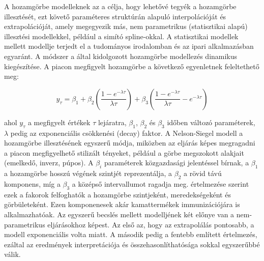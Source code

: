 \documentclass[12pt,bibliography=totoc]{article}
\begin{document}
A hozamgörbe modelleknek az a célja, hogy lehetővé tegyék a hozamgörbe illesztését, ezt követő paraméteres struktúrán alapuló interpolációját és extrapolációját, amely megegyezik más, nem parametrikus (statisztikai alapú) illesztési modellekkel, például a simító spline-okkal.
A statisztikai modellek mellett \cite{diebold2006forecasting} modellje terjedt el a tudományos irodalomban és az ipari alkalmazásban egyaránt. A módszer a \cite{nelson1987parsimonious} által kidolgozott hozamgörbe modellezés dinamikus kiegészítése. A piacon megfigyelt hozamgörbe a  következő egyenletnek feleltethető meg:

\begin{equation}
y_{\tau}=\beta_{1}+\beta_{2}\left ( \frac{1-e^{-\lambda\tau}}{\lambda\tau} \right )+\beta_{3}\left ( \frac{1-e^{-\lambda\tau}}{\lambda\tau} -e^{-\lambda\tau}\right )
\end{equation}


ahol $y_{\tau}$ a megfigyelt értékek $\tau$ lejáratra, $\beta_{1}$, $\beta_{2}$ és $\beta_{3}$ időben változó paraméterek, $\lambda$ pedig az exponenciális csökkenési (decay) faktor.
A Nelson-Siegel modell a hozamgörbe illesztésének egyszerű módja, miközben az eljárás képes megragadni a piacon megfigyelhető stilizált tényeket, például a görbe megszokott alakjait (emelkedő, inverz, púpos). 
 A  $\beta_{i}$ paraméterek közgazdasági jelentéssel bírnak, a $\beta_{1}$ a hozamgörbe hosszú végének szintjét reprezentálja, a $\beta_{2}$ a rövid távú komponens, míg a $\beta_{3}$ a középső intervallumot ragadja meg. \cite{litterman1991common} értelmezése szerint ezek a fakorok felfoghatók a hozamgörbe szintjeként, meredekségeként és görbületeként. Ezen komponenesek akár kamattermékek immunizációjára is alkalmazhatóak. Az egyszerű becslés mellett \cite{diebold2006forecasting} modelljének két előnye van a nem-parametrikus eljárásokhoz képest. Az első az, hogy az extrapolálás pontosabb, a modell exponenciális volta miatt. A második pedig a fentebb említett \cite{litterman1991common} értelmezés, ezáltal az eredmények interpretációja és összehasonlíthatósága sokkal egyszerűbbé válik.
 
\end{document}
